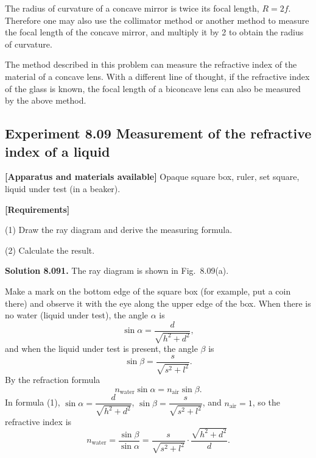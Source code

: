 The radius of curvature of a concave mirror is twice its focal length, $R=2f$. Therefore one may also use the collimator method or another method to measure the focal length of the concave mirror, and multiply it by 2 to obtain the radius of curvature.

\begin{commentary}
The method described in this problem can measure the refractive index of the material of a concave lens. With a different line of thought, if the refractive index of the glass is known, the focal length of a biconcave lens can also be measured by the above method.
\end{commentary}

\subsection*{Experiment 8.09 \quad Measurement of the refractive index of a liquid}

\textbf{[Apparatus and materials available]} Opaque square box, ruler, set square, liquid under test (in a beaker).

\textbf{[Requirements]}

(1) Draw the ray diagram and derive the measuring formula.

(2) Calculate the result.

\textbf{Solution 8.09}\quad \textbf{1.} The ray diagram is shown in Fig.~8.09(a).

Make a mark on the bottom edge of the square box (for example, put a coin there) and observe it with the eye along the upper edge of the box. When there is no water (liquid under test), the angle $\alpha$ is
\[
\sin\alpha=\frac{d}{\sqrt{h^2+d^2}},
\]
and when the liquid under test is present, the angle $\beta$ is
\[
\sin\beta=\frac{s}{\sqrt{s^2+l^2}}.
\]
By the refraction formula
\begin{equation}
n_{\text{water}}\sin\alpha=n_{\text{air}}\sin\beta. \tag{1}
\end{equation}
In formula (1), $\sin\alpha=\dfrac{d}{\sqrt{h^2+d^2}}$, $\sin\beta=\dfrac{s}{\sqrt{s^2+l^2}}$, and $n_{\text{air}}=1$, so the refractive index is
\begin{equation}
n_{\text{water}}=\frac{\sin\beta}{\sin\alpha}
=\frac{s}{\sqrt{s^2+l^2}}\cdot\frac{\sqrt{h^2+d^2}}{d}. \tag{2}
\end{equation}

